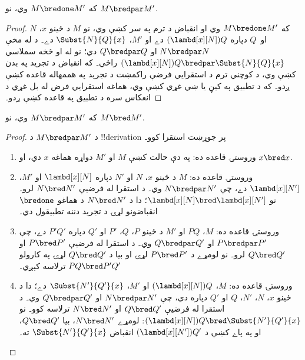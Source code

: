 \documentclass[../../../include/open-logic-section]{subfiles}
\begin{document}


\begin{lem}
  که $M \bredone M'$ وي، نو $M \bredpar M'$.
\end{lem}
\begin{proof} که $M \bredone M'$ وي او انقباض د ترم په سر کښې
    وي، نو $M$ د ځينو $x$، $N$ او~$Q$ دپاره
    $(\lambd[x][N])Q$ دے او $M'$، $\Subst{N}{Q}{x}$ دے۔
    د  له مخې $N \bredpar N$ او $Q \bredpar Q$
    دي؛ نو له  او
     څخه سملاسي
    $(\lambd[x][N])Q \bredpar \Subst{N}{Q}{x}$ راځي۔
    که انقباض د تجريد په بدن کښې وي، د کوچني ترم د استقرايي فرضې راکمښت د تجريد په هممهاله قاعده کښې ږدو۔ که د تطبيق په کيڼ يا ښي غړي کښې وي، هماغه استقرايي فرض له بل غړي د انعکاس سره د تطبيق په قاعده کښې ږدو۔
\end{proof}

\begin{lem}
  که $M \bredpar M'$ وي، نو $M \bred M'$.
\end{lem}

\begin{proof} د $M \bredpar M'$ د !!{derivation} پر جوړښت استقرا کوو۔
  \begin{enumerate}
  \item وروستۍ قاعده  ده: په دې حالت کښې
    $M$ او $M'$ دواړه هماغه $x$ دي، او $x \bred x$.
  \item وروستۍ قاعده  ده: $M$ د ځينو
    $x$، $N$ او $N'$ دپاره $\lambd[x][N]$ او $M'$،
    $\lambd[x][N']$ دے، چې $N \bredpar N'$ وي۔ د استقرا له
    فرضيې $N \bred N'$ لرو۔ نو $\lambd[x][N] \bred
    \lambd[x][N']$؛ دا د $N \bred N'$ د هماغو $\bredone$
    انقباضونو لړۍ د تجريد دننه تطبيقول دي۔
  \item وروستۍ قاعده  ده: $M$،
    $PQ$ او $M'$ د ځينو $P$، $Q$، $P'$ او $Q'$ دپاره $P'Q'$
    دے، چې $P \bredpar P'$ او $Q \bredpar Q'$ وي۔ د استقرا
    له فرضيې $P \bred P'$ او $Q \bred Q'$ لرو۔ نو لومړے
    د $P \bred P'$ لړۍ او بيا د $Q \bred Q'$ لړۍ په کارولو
    $PQ \bred P'Q'$ ترلاسه کېږي۔
  \item وروستۍ قاعده  ده: $M$،
    $(\lambd[x][N])Q$ او $M'$، $\Subst{N'}{Q'}{x}$ دے؛ دا
    د ځينو $x$، $N$، $N'$، $Q$ او $Q'$ دپاره دي، چې
    $N \bredpar N'$ او $Q \bredpar Q'$ وي۔ د استقرا له
    فرضيې $Q \bred Q'$ او $N \bred N'$ ترلاسه کوو۔ نو
    $(\lambd[x][N])Q \bred \Subst{N'}{Q'}{x}$: لومړے
    $N \bred N'$، بيا $Q \bred Q'$، او په پاے کښې د
    $(\lambd[x][N'])Q'$ انقباض $\Subst{N'}{Q'}{x}$ ته۔
  \end{enumerate}
\end{proof}
\end{document}
